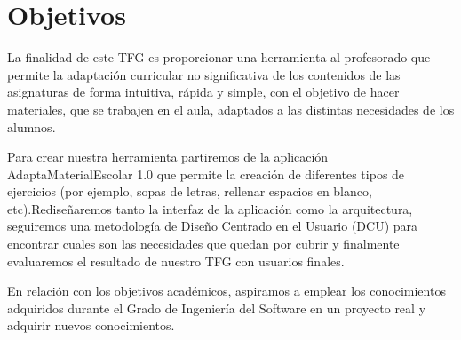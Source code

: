 \section{Objetivos}\label{cap:objetivos}
La finalidad de este TFG es proporcionar una herramienta al profesorado que permite la adaptación curricular no significativa de los contenidos de las asignaturas de forma intuitiva, rápida y simple, con el objetivo de hacer materiales, que se trabajen en el aula, adaptados a las distintas necesidades de los alumnos.

Para crear nuestra herramienta partiremos de la aplicación AdaptaMaterialEscolar 1.0  que permite la creación de diferentes tipos de ejercicios (por ejemplo, sopas de letras, rellenar espacios en blanco, etc).Rediseñaremos tanto la interfaz de la aplicación como la arquitectura, seguiremos una metodología de Diseño Centrado en el Usuario (DCU) para encontrar cuales son las necesidades que quedan por cubrir y finalmente evaluaremos el resultado de nuestro TFG con usuarios finales.
 
En relación con los objetivos académicos, aspiramos a emplear los conocimientos adquiridos durante el Grado de Ingeniería del Software en un proyecto real y adquirir nuevos conocimientos.



